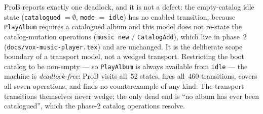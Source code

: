 \documentclass[a4paper,10pt,fleqn]{article}
\begin{document}
ProB reports exactly one deadlock, and it is not a defect: the empty-catalog
idle state (\texttt{catalogued} $= \emptyset$, \texttt{mode} $=$ \texttt{idle})
has no enabled transition, because \texttt{PlayAlbum} requires a catalogued
album and this model does not re-state the catalog-mutation operations
(\texttt{music new} / \texttt{CatalogAdd}), which live in phase~2
(\texttt{docs/vox-music-player.tex}) and are unchanged. It is the deliberate
scope boundary of a transport model, not a wedged transport. Restricting the
boot catalog to be non-empty --- so \texttt{PlayAlbum} is always available from
\texttt{idle} --- the machine is \emph{deadlock-free}: ProB visits all~52 states,
fires all~460 transitions, covers all seven operations, and finds no
counterexample of any kind. The transport transitions themselves never wedge;
the only dead end is ``no album has ever been catalogued'', which the phase-2
catalog operations resolve.
\end{document}
